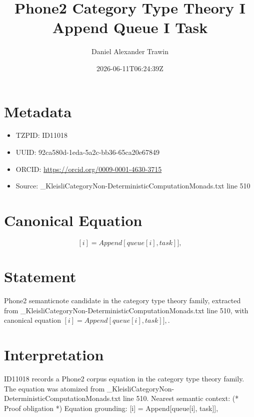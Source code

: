 \documentclass[11pt]{article}
\title{Phone2 Category Type Theory I Append Queue I Task}
\author{Daniel Alexander Trawin}
\date{2026-06-11T06:24:39Z}
\begin{document}
\maketitle
\section*{Metadata}
\begin{itemize}
\item TZPID: ID11018
\item UUID: 92ca580d-1eda-5a2c-bb36-65ca20e67849
\item ORCID: \url{https://orcid.org/0009-0001-4630-3715}
\item Source: _KleisliCategoryNon-DeterministicComputationMonads.txt line 510
\end{itemize}
\section*{Canonical Equation}
\[
[i] = Append[queue[i], task]],
\]
\section*{Statement}
Phone2 semanticnote candidate in the category type theory family, extracted from _KleisliCategoryNon-DeterministicComputationMonads.txt line 510, with canonical equation $[i] = Append[queue[i], task]],$.
\section*{Interpretation}
ID11018 records a Phone2 corpus equation in the category type theory family. The equation was atomized from _KleisliCategoryNon-DeterministicComputationMonads.txt line 510. Nearest semantic context: (* Proof obligation *) Equation grounding: [i] = Append[queue[i], task]],
\end{document}
